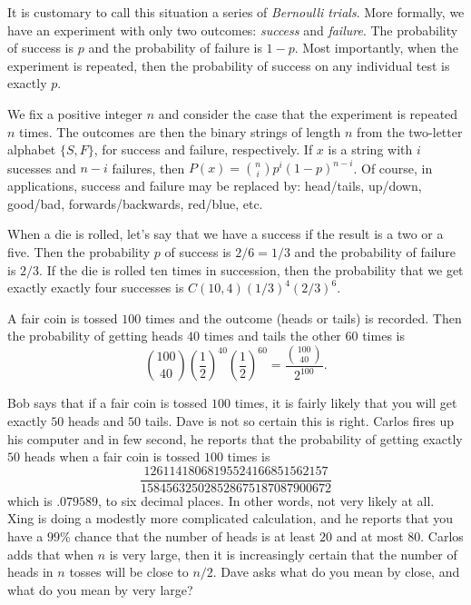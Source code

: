 It is customary to call this situation a series of \textit{Bernoulli
trials}.  More formally, we have an experiment with only two
outcomes: \textit{success} and \textit{failure}.  The probability
of success is $p$ and the probability of failure is $1-p$.  Most importantly,
when the experiment is repeated, then the probability of success on any
individual test is exactly $p$.  

We fix a positive integer $n$ and consider the case that the experiment
is repeated $n$ times.  The outcomes are then the binary strings of
length $n$ from the two-letter alphabet $\{S,F\}$, for success and failure, 
respectively.  If $x$ is a string with $i$ sucesses and $n-i$ failures, then 
$P(x)=\binom{n}{i}p ^i(1-p)^{n-i}$.  Of course, in applications, success
and failure may be replaced by: head/tails, up/down, good/bad, forwards/backwards,
red/blue, etc.

\begin{example}
  When a die is rolled, let's say that we have a success if the result
  is a two or a five.  Then the probability $p$ of success is
  $2/6=1/3$ and the probability of failure is $2/3$.  If the die is
  rolled ten times in succession, then the probability that we get
  exactly exactly four successes is $C(10,4)(1/3)^4 (2/3)^{6}$.
\end{example}

\begin{example}
A fair coin is tossed $100$ times and the outcome (heads or tails)
is recorded.  Then the probability of getting heads $40$ times
and tails the other $60$ times is 
\[
\binom{100}{40}\left(\frac{1}{2}\right)^{40}\left(\frac{1}{2}\right)^{60}=\frac{\binom{100}{40}}{2^{100}}.
\]
\end{example}

\begin{discussion}
Bob says that if a fair coin is tossed $100$ times, it is fairly likely
that you will get exactly $50$ heads and $50$ tails.  Dave is not so certain
this is right.  Carlos fires up his computer and in few second, he reports
that the probability of getting exactly $50$ heads when a fair coin is
tossed $100$ times is
\[
\frac{12611418068195524166851562157}{158456325028528675187087900672}
\]
which is $.079589$, to six decimal places. 
In other words, not very likely at all.  Xing is doing a modestly more complicated
calculation, and he reports that you have a $99$\% chance that the number
of heads is at least $20$ and at most $80$.  Carlos adds that when $n$ 
is very large, then it is increasingly certain that the number of heads
in $n$ tosses will be close to $n/2$.  Dave asks what do you mean by
close, and what do you mean by very large?
\end{discussion}

